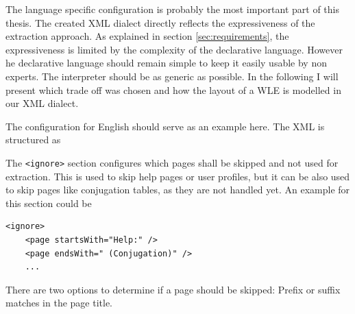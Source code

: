The language specific configuration is probably the most important part of this thesis. 
The created XML dialect directly reflects the expressiveness of the extraction approach. 
As explained in section \ref{sec:requirements}, the expressiveness is limited by the complexity of the declarative language. 
However he declarative language should remain simple to keep it easily usable by non experts. 
The interpreter should be as generic as possible. 
In the following I will present which trade off was chosen and how the layout of a WLE is modelled in our XML dialect.

The configuration for English should serve as an example here. 
The XML is structured as

The \texttt{<ignore>} section configures which pages shall be skipped and not used for extraction. 
This is used to skip help pages or user profiles, but it can be also used to skip pages like conjugation tables, as they are not handled yet. 
An example for this section could be
\begin{lstlisting}[style=XML]
<ignore>
	<page startsWith="Help:" />
	<page endsWith=" (Conjugation)" />
	...
\end{lstlisting}
There are two options to determine if a page should be skipped: Prefix or suffix matches in the page title.

